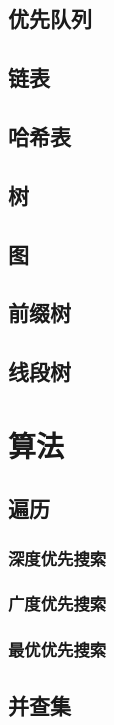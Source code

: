 \section{优先队列}

\section{链表}

\section{哈希表}

\section{树}

\section{图}

\section{前缀树}
\section{线段树}

\chapter{算法}
\section{遍历}
\subsection{深度优先搜索}

\subsection{广度优先搜索}

\subsection{最优优先搜索}

\section{并查集}


